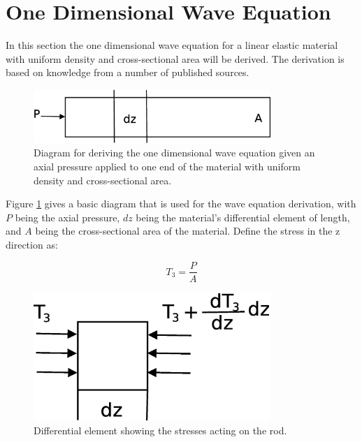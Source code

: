 \section{One Dimensional Wave Equation}

In this section the one dimensional wave equation for a linear elastic material with uniform density and cross-sectional area will be derived. The derivation is based on knowledge from a number of published sources.

\begin{figure}[ht!]
\centering
\includegraphics[width=0.8\textwidth]{eps_pics/deriveWaveRod}
\caption{Diagram for deriving the one dimensional wave equation given an axial pressure applied to one end of the material with uniform density and cross-sectional area.
	 \label{fig:deriveWaveRod}} 
\end{figure}

Figure \ref{fig:deriveWaveRod} gives a basic diagram that is used for the wave equation derivation, with $P$ being the axial pressure, $dz$ being the material's differential element of length, and $A$ being the cross-sectional area of the material. Define the stress in the z direction as:

\begin{equation}
T_3 = \frac{P}{A}
\end{equation}


\begin{figure}[ht!]
\centering
\includegraphics[width=0.8\textwidth]{eps_pics/diffElementRod}
\caption{Differential element showing the stresses acting on the rod.
	 \label{fig:diffElementRod}} 
\end{figure}

